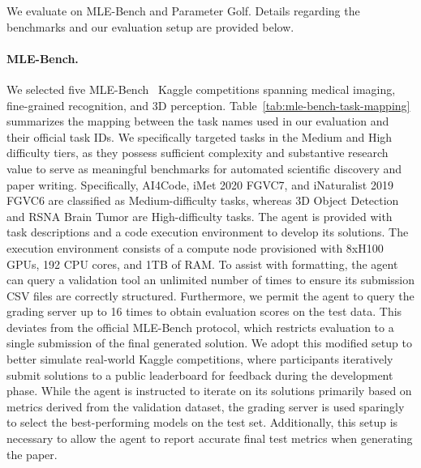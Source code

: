 We evaluate \sys{} on MLE-Bench and Parameter Golf. Details regarding the benchmarks and our evaluation setup are provided below.

\paragraph{MLE-Bench.} We selected five MLE-Bench~\cite{chan2024mle} Kaggle competitions spanning medical imaging, fine-grained recognition, and 3D perception. Table~\ref{tab:mle-bench-task-mapping} summarizes the mapping between the task names used in our evaluation and their official task IDs. We specifically targeted tasks in the Medium and High difficulty tiers, as they possess sufficient complexity and substantive research value to serve as meaningful benchmarks for automated scientific discovery and paper writing. Specifically, AI4Code, iMet 2020 FGVC7, and iNaturalist 2019 FGVC6 are classified as Medium-difficulty tasks, whereas 3D Object Detection and RSNA Brain Tumor are High-difficulty tasks. The agent is provided with task descriptions and a code execution environment to develop its solutions. The execution environment consists of a compute node provisioned with 8xH100 GPUs, 192 CPU cores, and 1TB of RAM. To assist with formatting, the agent can query a validation tool an unlimited number of times to ensure its submission CSV files are correctly structured. Furthermore, we permit the agent to query the grading server up to 16 times to obtain evaluation scores on the test data. This deviates from the official MLE-Bench protocol, which restricts evaluation to a single submission of the final generated solution. We adopt this modified setup to better simulate real-world Kaggle competitions, where participants iteratively submit solutions to a public leaderboard for feedback during the development phase. While the agent is instructed to iterate on its solutions primarily based on metrics derived from the validation dataset, the grading server is used sparingly to select the best-performing models on the test set. Additionally, this setup is necessary to allow the agent to report accurate final test metrics when generating the paper.


